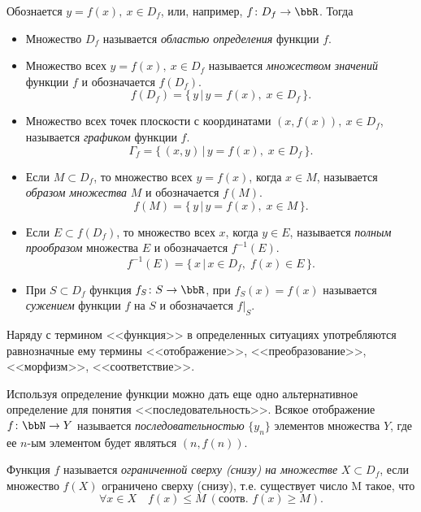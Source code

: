 Обознается $y=f(x),\ x\in D_f$, или, например, $f\colon D_f \to \bbR$. Тогда
\begin{itemize}[wide, labelwidth=!, labelindent=0pt]
\item
Множество $D_f$ называется \textit{областью определения} функции $f$.
\item
Множество всех $y=f(x),\ x\in D_f$ называется \textit{множеством значений} функции $f$ и обозначается $f(D_f)$. $$f(D_f)=\{\,y \,\big|\, y=f(x),\; x\in D_f\,\}.$$
\item 
Множество всех точек плоскости с координатами $(x, f(x)),\ x\in D_f$, называется \textit{графиком} функции $f$. $$\Gamma_f = \{\,(x,y) \,\big|\, y = f(x),\; x\in D_f\,\}.$$
\item
Если $M \subset D_f$, то множество всех $y=f(x)$, когда $x\in M$, называется \textit{образом множества} $M$ и обозначается $f(M)$. $$f(M) = \{\,y\,\big|\, y=f(x),\; x\in M\,\}.$$
\item
Если $E \subset f(D_f)$, то множество всех $x$, когда $y\in E$, называется \textit{полным прообразом} множества $E$ и обозначается $f^{-1}(E)$. $$f^{-1}(E)=\{\,x \,\big|\, x\in D_f,\; f(x)\in E\,\}.$$
\item
При $S\subset D_f$ функция $f_S\colon S\to\bbR$, при $f_S(x)=f(x)$ называется \textit{сужением} функции $f$ на $S$ и обозначается $f\bigr|_S$.
\end{itemize}
 
Наряду с термином <<функция>> в определенных ситуациях употребляются равнозначные ему термины <<отображение>>, <<преобразование>>, <<морфизм>>, <<соответствие>>.
\begin{notion}
Используя определение функции можно дать еще одно альтернативное определение для понятия <<последовательность>>. Всякое отображение $f\colon \bbN \to Y$  называется \textit{последовательностью} $\{y_n\}$ элементов множества $Y$, где ее $n$-ым элементом будет являться $(n,f(n))$.
\end{notion} 

\begin{defn}
Функция $f$ называется \textit{ограниченной сверху (снизу) на множестве} $X\subset D_f$, если множество $f(X)$ ограничено сверху (снизу), т.е. существует число M такое, что
$$
\forall x \in X \quad f(x) \le M \ (\text{соотв. } f(x)\ge M).
$$
\end{defn}

